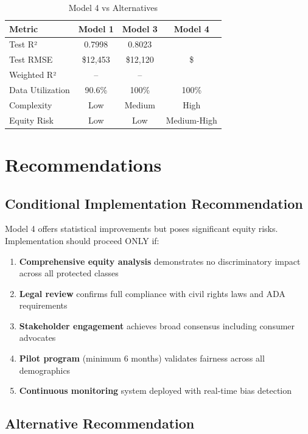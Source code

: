 \begin{table}[h]
\centering
\caption{Model 4 vs Alternatives}
\begin{tabular}{lccc}
\toprule
\textbf{Metric} & \textbf{Model 1} & \textbf{Model 3} & \textbf{Model 4} \\
\midrule
Test R² & 0.7998 & 0.8023 & \ModelFourRSquaredTest{} \\
Test RMSE & \$12,453 & \$12,120 & \$\ModelFourRMSETest{} \\
Weighted R² & -- & -- & \ModelFourWeightedRSquared{} \\
Data Utilization & 90.6\% & 100\% & 100\% \\
Complexity & Low & Medium & High \\
Equity Risk & Low & Low & Medium-High \\
\bottomrule
\end{tabular}
\end{table}

\section{Recommendations}

\subsection{Conditional Implementation Recommendation}

Model 4 offers statistical improvements but poses significant equity risks. Implementation should proceed ONLY if:

\begin{enumerate}
    \item \textbf{Comprehensive equity analysis} demonstrates no discriminatory impact across all protected classes
    \item \textbf{Legal review} confirms full compliance with civil rights laws and ADA requirements
    \item \textbf{Stakeholder engagement} achieves broad consensus including consumer advocates
    \item \textbf{Pilot program} (minimum 6 months) validates fairness across all demographics
    \item \textbf{Continuous monitoring} system deployed with real-time bias detection
\end{enumerate}

\subsection{Alternative Recommendation}

